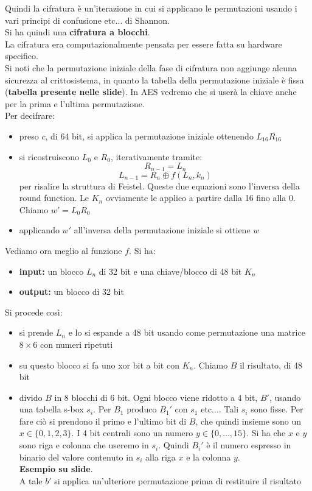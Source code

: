 \documentclass[a4paper,12pt, oneside]{book}
\begin{document}
Quindi la cifratura è un'iterazione in cui si applicano le permutazioni usando i
vari principi di confusione etc$\ldots$ di Shannon.\\
Si ha quindi una \textbf{cifratura a blocchi}.\\
La cifratura era computazionalmente pensata per essere fatta su hardware
specifico. \\
Si noti che la permutazione iniziale della fase di cifratura non aggiunge alcuna
sicurezza al crittosistema, in quanto la tabella della permutazione iniziale
è fissa (\textbf{tabella presente nelle slide}). In AES vedremo che si userà la
chiave anche per la prima e l'ultima permutazione.\\
Per decifrare:
\begin{itemize}
  \item preso $c$, di 64 bit, si applica la permutazione iniziale ottenendo
  $L_{16}R_{16}$
  \item si ricostruiscono $L_0$ e $R_0$, iterativamente tramite:
  \[R_{n-1}=L_n\]
  \[L_{n-1}=R_n\oplus f(L_n,k_n)\]
  per risalire la struttura di Feistel. Queste due equazioni sono l'inversa
  della round function. Le $K_n$ ovviamente le applico a partire
  dalla 16 fino alla 0.\\
  Chiamo $w'=L_0R_0$
  \item applicando $w'$ all'inversa della permutazione iniziale si ottiene $w$
\end{itemize}
Vediamo ora meglio al funzione $f$. Si ha:
\begin{itemize}
  \item \textbf{input:} un blocco $L_n$ di 32 bit e una chiave/blocco di 48 bit
  $K_n$ 
  \item \textbf{output:} un blocco di 32 bit
\end{itemize}
Si procede così:
\begin{itemize}
  \item si prende $L_n$ e lo si espande a 48 bit usando come permutazione una
  matrice $8\times 6$ con numeri ripetuti
  \item su questo blocco si fa uno xor bit a bit con $K_n$. Chiamo $B$ il
  risultato, di 48 bit
  \item divido $B$ in 8 blocchi di 6 bit. Ogni blocco viene ridotto a 4 bit,
  $B'$, usando una tabella s-box $s_i$. Per $B_1$ produco $B_1'$ con $s_1$
  etc$\ldots$. Tali $s_i$ sono fisse. Per fare ciò si prendono il primo e
  l'ultimo bit di $B$, che quindi insieme sono un $x\in\{0,1,2,3\}$. I 4 bit
  centrali sono un numero $y\in\{0,\ldots,15\}$. Si ha che $x$ e $y$ sono riga e
  colonna che useremo in $s_i$. Quindi $B_i'$ è il numero espresso in binario
  del valore contenuto in $s_i$ alla riga $x$ e la colonna $y$.\\
  \textbf{Esempio su slide}.\\
  A tale $b'$ si applica un'ulteriore permutazione prima di restituire il
  risultato 
\end{itemize}
\end{document}
